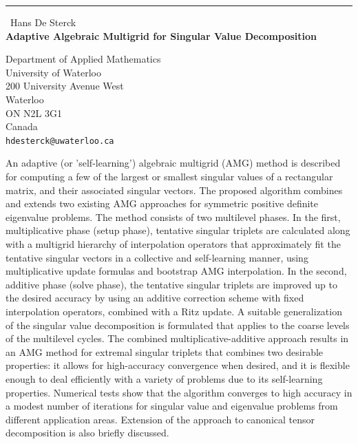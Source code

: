 \documentclass{report}
\begin{document}
\begin{center}
\rule{6in}{1pt} \
{\large Hans De Sterck \\
{\bf Adaptive Algebraic Multigrid for Singular Value Decomposition}}

Department of Applied Mathematics \\ University of Waterloo \\ 200 University Avenue West \\ Waterloo \\ ON N2L 3G1 \\ Canada
\\
{\tt hdesterck@uwaterloo.ca}\end{center}

An adaptive (or 'self-learning') algebraic multigrid (AMG) method is
described for computing a few of the largest or smallest singular values
of a rectangular matrix, and their associated singular vectors. The
proposed algorithm combines and extends two existing AMG approaches for
symmetric positive definite eigenvalue problems. The method consists of
two multilevel phases. In the first, multiplicative phase (setup phase),
tentative singular triplets are calculated along with a multigrid
hierarchy of interpolation operators that approximately fit the tentative
singular vectors in a collective and self-learning manner, using
multiplicative update formulas and bootstrap AMG interpolation. In the
second, additive phase (solve phase), the tentative singular triplets are
improved up to the desired accuracy by using an additive correction
scheme with fixed interpolation operators, combined with a Ritz update. A
suitable generalization of the singular value decomposition is formulated
that applies to the coarse levels of the multilevel cycles. The combined
multiplicative-additive approach results in an AMG method for extremal
singular triplets that combines two desirable properties: it allows for
high-accuracy convergence when desired, and it is flexible enough to deal
efficiently with a variety of problems due to its self-learning
properties. Numerical tests show that the algorithm converges to high
accuracy in a modest number of iterations for singular value and
eigenvalue problems from different application areas. Extension of the
approach to canonical tensor decomposition is also briefly discussed.
\end{document}
